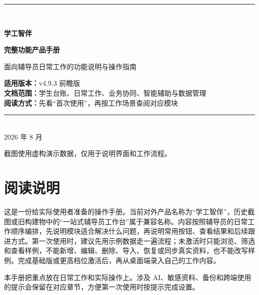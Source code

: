 \documentclass[UTF8,zihao=-4,oneside]{ctexrep}
\newcommand{\productname}{学工智伴}
\newcommand{\version}{v4.9.3 前瞻版}
\begin{document}
\begin{titlepage}
  \thispagestyle{empty}
  \vspace*{20mm}
  \begin{center}
    {\color{CWBblue}\rule{0.72\textwidth}{1.3pt}}\\[12mm]
    {\Huge\bfseries\color{CWBink} \productname\par}
    \vspace{7mm}
    {\LARGE\bfseries 完整功能产品手册\par}
    \vspace{8mm}
    {\large\color{CWBgray}面向辅导员日常工作的功能说明与操作指南\par}
    \vfill
    \begin{tcolorbox}[width=0.78\textwidth,colback=CWBfill,colframe=CWBline,boxrule=0.5pt,arc=1.5mm]
      \centering
      \large
      \textbf{适用版本：}\version\\[4pt]
      \textbf{文档范围：}学生台账、日常工作、业务协同、智能辅助与数据管理\\[4pt]
      \textbf{阅读方式：}先看“首次使用”，再按工作场景查阅对应模块
    \end{tcolorbox}
    \vfill
    {\color{CWBgray}\rule{0.72\textwidth}{0.4pt}}\\[5mm]
    {\large 2026 年 8 月}\par
    \vspace{4mm}
    {\small\color{CWBgray}截图使用虚构演示数据，仅用于说明界面和工作流程。}
  \end{center}
\end{titlepage}

\chapter*{阅读说明}

这是一份给实际使用者准备的操作手册。当前对外产品名称为“学工智伴”，历史截图或旧构建物中的“一站式辅导员工作台”属于兼容名称。内容按照辅导员的日常工作顺序编排，先说明模块适合解决什么问题，再说明常用按钮、查看结果和后续跟进方式。第一次使用时，建议先用示例数据走一遍流程；未激活时只能浏览、筛选和查看样例，不能新增、编辑、删除、导入、恢复或同步真实资料，也不能改写样例。完成基础版或更高档位激活后，再从桌面端录入自己的工作内容。

\begin{infobox}
本手册把重点放在日常工作和实际操作上。涉及 AI、敏感资料、备份和跨端使用的提示会保留在对应章节，方便第一次使用时按提示完成设置。
\end{infobox}
\end{document}
